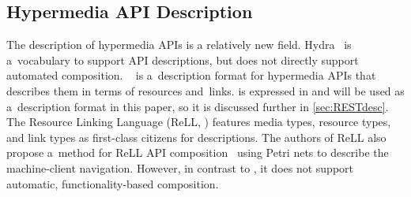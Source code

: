 \subsection{Hypermedia API Description}
The description of hypermedia APIs is a relatively new field.
Hydra~\cite{HydraVocabulary} is a~vocabulary to support API descriptions,
but does not directly support automated composition.
\restdesc~\cite{verborgh_wsrest_2012}
is a~description format
for hypermedia APIs that describes them in terms of resources and~links.
\restdesc is expressed in \nthree
and will be used as a~description format in this paper,
so it is discussed further in \cref{sec:RESTdesc}.
The Resource Linking Language (ReLL, \cite{ReLL}) features media types, resource types, and link types as first-class citizens for descriptions.
The authors of ReLL also propose a~method
for ReLL API composition~\cite{ReLLComposition}
using Petri nets to describe the machine-client navigation.
However, in contrast to \restdesc, it does not support
automatic, functionality-based composition.


